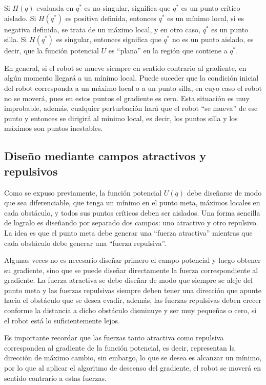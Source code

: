 Si $H(q)$ evaluada en $q^*$ es no singular, significa que $q^*$ es un punto crítico aislado. Si $H(q^*)$ es positiva definida, entonces $q^*$ es un mínimo local, si es negativa definida, se trata de un máximo local, y en otro caso, $q^*$ es un punto silla. Si $H(q^*)$ es singular, entonces significa que $q^*$ no es un punto aislado, es decir, que la función potencial $U$ es ``plana'' en la región que contiene a $q^*$. 

En general, si el robot se mueve siempre en sentido contrario al gradiente, en algún momento llegará a un mínimo local. Puede suceder que la condición inicial del robot corresponda a un máximo local o a un punto silla, en cuyo caso el robot no se moverá, pues en estos puntos el gradiente es cero. Esta situación es muy improbable, además, cualquier perturbación hará que el robot ``se mueva'' de ese punto y entonces se dirigirá al mínimo local, es decir, los puntos silla y los máximos son puntos inestables. 

\subsection{Diseño mediante campos atractivos y repulsivos}
Como se expuso previamente, la función potencial $U(q)$ debe diseñarse de modo que sea diferenciable, que tenga un mínimo en el punto meta, máximos locales en cada obstáculo, y todos sus puntos críticos deben ser aislados. Una forma sencilla de logralo es diseñando por separado dos campos: uno atractivo y otro repulsivo. La idea es que el punto meta debe generar una ``fuerza atractiva'' mientras que cada obstáculo debe generar una ``fuerza repulsiva''. 

Algunas veces no es necesario diseñar primero el campo potencial y luego obtener su gradiente, sino que se puede diseñar directamente la fuerza correspondiente al gradiente. La fuerza atractiva se debe diseñar de modo que siempre se aleje del punto meta y las fuerzas repulsivas siempre deben tener una dirección que apunte hacia el obstáculo que se desea evadir, además, las fuerzas repulsivas deben crecer conforme la distancia a dicho obstáculo disminuye y ser muy pequeñas o cero, si el robot está lo suficientemente lejos. 

Es importante recordar que las fuerzas tanto atractiva como repulsiva corresponden al gradiente de la función potencial, es decir, representan la dirección de máximo cambio, sin embargo, lo que se desea es alcanzar un mínimo, por lo que al aplicar el algoritmo de descenso del gradiente, el robot se moverá en sentido contrario a estas fuerzas. 

